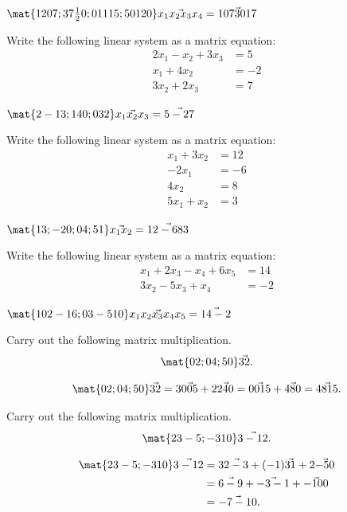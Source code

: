\begin{problems}
\begin{solution}
    \(
    \mat{1 2 0 7; 3 7 \tfrac{1}{2} 0; 0 1 1 15; 5 0 12 0}
    \vec{x_1 x_2 x_3 x_4}
    =
    \vec{10 7 30 17}
    \)
\end{solution}

\problem  
Write the following linear system as a matrix equation:  
\[
\begin{aligned}
2x_1 - x_2 + 3x_3 &= 5 \\
x_1 + 4x_2        &= -2 \\
3x_2 + 2x_3       &= 7
\end{aligned}
\]

\begin{solution}
\(
\mat{2 -1 3; 1 4 0; 0 3 2}
\vec{x_1 x_2 x_3}
=
\vec{5 -2 7}
\)
\end{solution}

\problem  
Write the following linear system as a matrix equation:  
\[
\begin{aligned}
x_1 + 3x_2 &= 12 \\
-2x_1      &= -6 \\
4x_2       &= 8 \\
5x_1 + x_2 &= 3
\end{aligned}
\]

\begin{solution}
\(
\mat{1 3; -2 0; 0 4; 5 1}
\vec{x_1 x_2}
=
\vec{12 -6 8 3}
\)
\end{solution}

\problem  
Write the following linear system as a matrix equation:  
\[
\begin{aligned}
x_1 + 2x_3 - x_4 + 6x_5 &= 14 \\
3x_2 - 5x_3 + x_4        &= -2
\end{aligned}
\]

\begin{solution}
\(
\mat{1 0 2 -1 6; 0 3 -5 1 0}
\vec{x_1 x_2 x_3 x_4 x_5}
=
\vec{14 -2}
\)
\end{solution}





\problem %
Carry out the following matrix multiplication.
\[\mat{0 2; 0 4; 5 0} \vec{3 2}.\]
\begin{solution}
\[\mat{0 2; 0 4; 5 0} \vec{3 2} 
= 3 \vec{0 0 5} + 2 \vec{2 4 0} = \vec{0 0 15} + \vec{4 8 0}
= \vec{4 8 15}.\]  
\end{solution}

\problem %
Carry out the following matrix multiplication.
\[\mat{2 3 -5; -3 1 0} \vec{3 -1 2}.\]
\begin{solution}
  \begin{align*}
    \mat{2 3 -5; -3 1 0} \vec{3 -1 2}
    & = 3 \vec{2 -3} + (-1) \vec{3 1} + 2 \vec{-5 0} \\
    & = \vec{6 -9} + \vec{-3 -1} + \vec{-10 0} \\
    & = \vec{-7 -10}.
  \end{align*}
\end{solution}


\end{problems}
